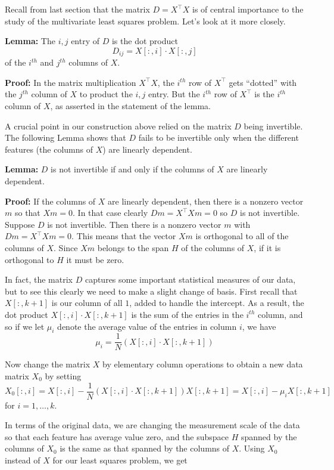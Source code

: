 \documentclass[]{article}
\begin{document}
Recall from last section that the matrix \(D=X^{\intercal}X\) is of
central importance to the study of the multivariate least squares
problem. Let's look at it more closely.

\textbf{Lemma:} The \(i,j\) entry of \(D\) is the dot product \[
D_{ij}=X[:,i]\cdot X[:,j] \] of the \(i^{th}\) and \(j^{th}\) columns of
\(X\).

\textbf{Proof:} In the matrix multiplication \(X^{\intercal}X\), the
\(i^{th}\) row of \(X^{\intercal}\) gets ``dotted'' with the \(j^{th}\)
column of \(X\) to product the \(i,j\) entry. But the \(i^{th}\) row of
\(X^{\intercal}\) is the \(i^{th}\) column of \(X\), as asserted in the
statement of the lemma.

A crucial point in our construction above relied on the matrix \(D\)
being invertible. The following Lemma shows that \(D\) fails to be
invertible only when the different features (the columns of \(X\)) are
linearly dependent.

\textbf{Lemma:} \(D\) is not invertible if and only if the columns of
\(X\) are linearly dependent.

\textbf{Proof:} If the columns of \(X\) are linearly dependent, then
there is a nonzero vector \(m\) so that \(Xm=0\). In that case clearly
\(Dm=X^{\intercal}Xm=0\) so \(D\) is not invertible. Suppose \(D\) is
not invertible. Then there is a nonzero vector \(m\) with
\(Dm=X^{\intercal}Xm=0\). This means that the vector \(Xm\) is
orthogonal to all of the columns of \(X\). Since \(Xm\) belongs to the
span \(H\) of the columns of \(X\), if it is orthogonal to \(H\) it must
be zero.

In fact, the matrix \(D\) captures some important statistical measures
of our data, but to see this clearly we need to make a slight change of
basis. First recall that \(X[:,k+1]\) is our column of all \(1\), added
to handle the intercept. As a result, the dot product
\(X[:,i]\cdot X[:,k+1]\) is the sum of the entries in the \(i^{th}\)
column, and so if we let \(\mu_{i}\) denote the average value of the
entries in column \(i\), we have \[ \mu_{i} = \frac{1}{N}(X[:,i]\cdot
X[:,k+1]) \]

Now change the matrix \(X\) by elementary column operations to obtain a
new data matrix \(X_{0}\) by setting \[ X_{0}[:,i] =
X[:,i]-\frac{1}{N}(X[:,i]\cdot X[:,k+1])X[:,k+1] =
X[:,i]-\mu_{i}X[:,k+1] \] for \(i=1,\ldots, k\).

In terms of the original data, we are changing the measurement scale of
the data so that each feature has average value zero, and the subspace
\(H\) spanned by the columns of \(X_{0}\) is the same as that spanned by
the columns of \(X\). Using \(X_{0}\) instead of \(X\) for our least
squares problem, we get
\end{document}
